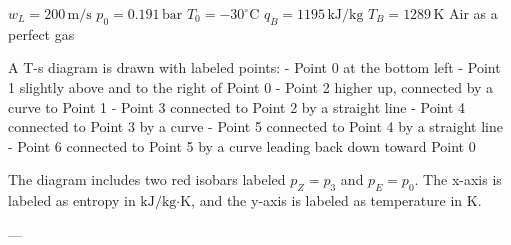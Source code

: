 \( w_L = 200 \, \text{m/s} \)  
\( p_0 = 0.191 \, \text{bar} \)  
\( T_0 = -30^\circ \text{C} \)  
\( q_B = 1195 \, \text{kJ/kg} \)  
\( T_B = 1289 \, \text{K} \)  
Air as a perfect gas  

A T-s diagram is drawn with labeled points:  
- Point 0 at the bottom left  
- Point 1 slightly above and to the right of Point 0  
- Point 2 higher up, connected by a curve to Point 1  
- Point 3 connected to Point 2 by a straight line  
- Point 4 connected to Point 3 by a curve  
- Point 5 connected to Point 4 by a straight line  
- Point 6 connected to Point 5 by a curve leading back down toward Point 0  

The diagram includes two red isobars labeled \( p_Z = p_3 \) and \( p_E = p_0 \).  
The x-axis is labeled as entropy in \( \text{kJ/kg·K} \), and the y-axis is labeled as temperature in \( \text{K} \).  

---